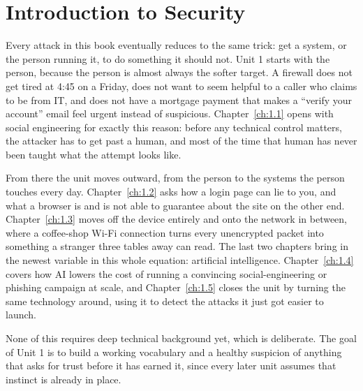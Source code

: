 \part{Introduction to Security}

Every attack in this book eventually reduces to the same trick: get a system, or the person
running it, to do something it should not. Unit 1 starts with the person, because the person is
almost always the softer target. A firewall does not get tired at 4:45 on a Friday, does not want
to seem helpful to a caller who claims to be from IT, and does not have a mortgage payment that
makes a ``verify your account'' email feel urgent instead of suspicious. Chapter~\ref{ch:1.1}
opens with social engineering for exactly this reason: before any technical control matters, the
attacker has to get past a human, and most of the time that human has never been taught what the
attempt looks like.

From there the unit moves outward, from the person to the systems the person touches every day.
Chapter~\ref{ch:1.2} asks how a login page can lie to you, and what a browser is and is not able
to guarantee about the site on the other end. Chapter~\ref{ch:1.3} moves off the device entirely
and onto the network in between, where a coffee-shop Wi-Fi connection turns every unencrypted
packet into something a stranger three tables away can read. The last two chapters bring in the
newest variable in this whole equation: artificial intelligence. Chapter~\ref{ch:1.4} covers how
AI lowers the cost of running a convincing social-engineering or phishing campaign at scale, and
Chapter~\ref{ch:1.5} closes the unit by turning the same technology around, using it to detect the
attacks it just got easier to launch.

None of this requires deep technical background yet, which is deliberate. The goal of Unit 1 is
to build a working vocabulary and a healthy suspicion of anything that asks for trust before it
has earned it, since every later unit assumes that instinct is already in place.
